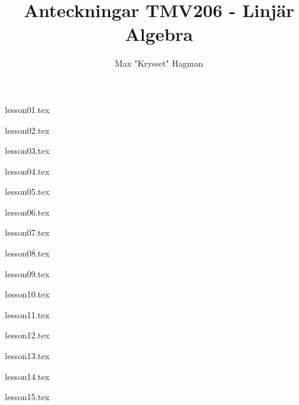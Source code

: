 \documentclass[a4paper]{report}
\title{Anteckningar TMV206 - Linjär Algebra}
\author{Max "Krysset" Hagman}
\begin{document}
    \newcommand{\prim}[1]{#1^{\prime}}

    \maketitle
    \tableofcontents


    {lesson01.tex}

    {lesson02.tex}

    {lesson03.tex}

    {lesson04.tex}

    {lesson05.tex}

    {lesson06.tex}

    {lesson07.tex}

    {lesson08.tex}

    {lesson09.tex}

    {lesson10.tex}

    {lesson11.tex}

    {lesson12.tex}

    {lesson13.tex}

    {lesson14.tex}

    {lesson15.tex}
\end{document}
